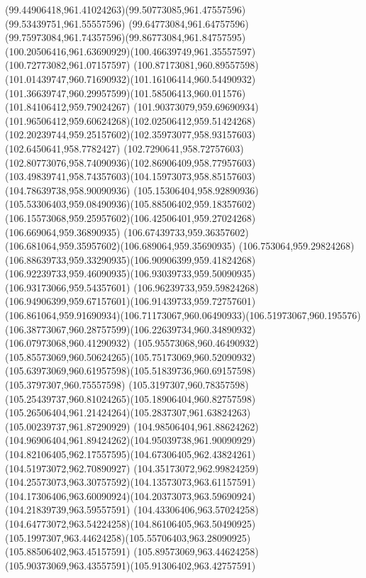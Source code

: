 {    \curveto(99.44906418,961.41024263)(99.50773085,961.47557596)(99.53439751,961.55557596)
    \curveto(99.64773084,961.64757596)(99.75973084,961.74357596)(99.86773084,961.84757595)
    \curveto(100.20506416,961.63690929)(100.46639749,961.35557597)(100.72773082,961.07157597)
    \curveto(100.87173081,960.89557598)(101.01439747,960.71690932)(101.16106414,960.54490932)
    \curveto(101.36639747,960.29957599)(101.58506413,960.011576)(101.84106412,959.79024267)
    \curveto(101.90373079,959.69690934)(101.96506412,959.60624268)(102.02506412,959.51424268)
    \curveto(102.20239744,959.25157602)(102.35973077,958.93157603)(102.6450641,958.7782427)
    \curveto(102.7290641,958.72757603)(102.80773076,958.74090936)(102.86906409,958.77957603)
    \curveto(103.49839741,958.74357603)(104.15973073,958.85157603)(104.78639738,958.90090936)
    \curveto(105.15306404,958.92890936)(105.53306403,959.08490936)(105.88506402,959.18357602)
    \curveto(106.15573068,959.25957602)(106.42506401,959.27024268)(106.669064,959.36890935)
    \curveto(106.67439733,959.36357602)(106.681064,959.35957602)(106.689064,959.35690935)
    \curveto(106.753064,959.29824268)(106.88639733,959.33290935)(106.90906399,959.41824268)
    \curveto(106.92239733,959.46090935)(106.93039733,959.50090935)(106.93173066,959.54357601)
    \curveto(106.96239733,959.59824268)(106.94906399,959.67157601)(106.91439733,959.72757601)
    \curveto(106.861064,959.91690934)(106.71173067,960.06490933)(106.51973067,960.195576)
    \curveto(106.38773067,960.28757599)(106.22639734,960.34890932)(106.07973068,960.41290932)
    \curveto(105.95573068,960.46490932)(105.85573069,960.50624265)(105.75173069,960.52090932)
    \curveto(105.63973069,960.61957598)(105.51839736,960.69157598)(105.3797307,960.75557598)
    \curveto(105.3197307,960.78357598)(105.25439737,960.81024265)(105.18906404,960.82757598)
    \curveto(105.26506404,961.21424264)(105.2837307,961.63824263)(105.00239737,961.87290929)
    \curveto(104.98506404,961.88624262)(104.96906404,961.89424262)(104.95039738,961.90090929)
    \curveto(104.82106405,962.17557595)(104.67306405,962.43824261)(104.51973072,962.70890927)
    \curveto(104.35173072,962.99824259)(104.25573073,963.30757592)(104.13573073,963.61157591)
    \curveto(104.17306406,963.60090924)(104.20373073,963.59690924)(104.21839739,963.59557591)
    \curveto(104.43306406,963.57024258)(104.64773072,963.54224258)(104.86106405,963.50490925)
    \curveto(105.1997307,963.44624258)(105.55706403,963.28090925)(105.88506402,963.45157591)
    \curveto(105.89573069,963.44624258)(105.90373069,963.43557591)(105.91306402,963.42757591)
}

